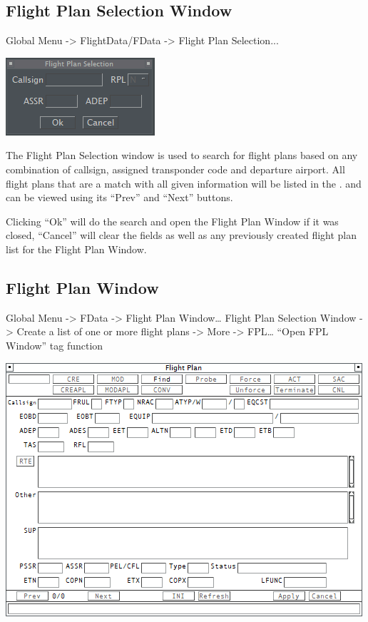 \documentclass[11pt,a4paper,oldfontcommands]{memoir}
\begin{document}
\subsection{Flight Plan Selection Window}
\label{win:fpsw}

Global Menu -> FlightData/FData -> Flight Plan Selection...

\includegraphics{img/fpsel.png}

The Flight Plan Selection window is used to search for flight plans based on any combination of callsign, assigned transponder code and departure airport. All flight plans that are a match with all given information will be listed in the \textit{}. and can be viewed using its “Prev” and “Next” buttons.

Clicking “Ok” will do the search and open the Flight Plan Window if it was closed, “Cancel” will clear the fields as well as any previously created flight plan list for the Flight Plan Window.

\subsection{Flight Plan Window}
\label{win:fpw}

Global Menu -> FData -> Flight Plan Window… 
Flight Plan Selection Window -> Create a list of one or more flight plans 
\textit{} -> More -> FPL… 
“Open FPL Window” tag function

\includegraphics{img/fpl.png}
\end{document}
